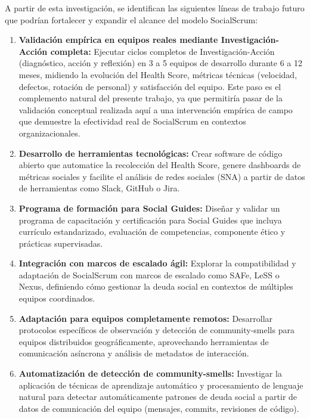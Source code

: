 A partir de esta investigación, se identifican las siguientes líneas de trabajo futuro que podrían fortalecer y expandir el alcance del modelo SocialScrum:

\begin{enumerate}
    \item \textbf{Validación empírica en equipos reales mediante Investigación-Acción completa:} Ejecutar ciclos completos de Investigación-Acción (diagnóstico, acción y reflexión) \cite{baskerville1999actionresearch} en 3 a 5 equipos de desarrollo durante 6 a 12 meses, midiendo la evolución del Health Score, métricas técnicas (velocidad, defectos, rotación de personal) y satisfacción del equipo. Este paso es el complemento natural del presente trabajo, ya que permitiría pasar de la validación conceptual realizada aquí a una intervención empírica de campo que demuestre la efectividad real de SocialScrum en contextos organizacionales.

    \item \textbf{Desarrollo de herramientas tecnológicas:} Crear software de código abierto que automatice la recolección del Health Score, genere dashboards de métricas sociales y facilite el análisis de redes sociales (SNA) a partir de datos de herramientas como Slack, GitHub o Jira.

    \item \textbf{Programa de formación para Social Guides:} Diseñar y validar un programa de capacitación y certificación para Social Guides que incluya currículo estandarizado, evaluación de competencias, componente ético y prácticas supervisadas.

    \item \textbf{Integración con marcos de escalado ágil:} Explorar la compatibilidad y adaptación de SocialScrum con marcos de escalado como SAFe, LeSS o Nexus, definiendo cómo gestionar la deuda social en contextos de múltiples equipos coordinados.

    \item \textbf{Adaptación para equipos completamente remotos:} Desarrollar protocolos específicos de observación y detección de \gls{community-smells} para equipos distribuidos geográficamente, aprovechando herramientas de comunicación asíncrona y análisis de metadatos de interacción.

    \item \textbf{Automatización de detección de \gls{community-smells}:} Investigar la aplicación de técnicas de aprendizaje automático y procesamiento de lenguaje natural para detectar automáticamente patrones de deuda social a partir de datos de comunicación del equipo (mensajes, commits, revisiones de código).


\end{enumerate}
